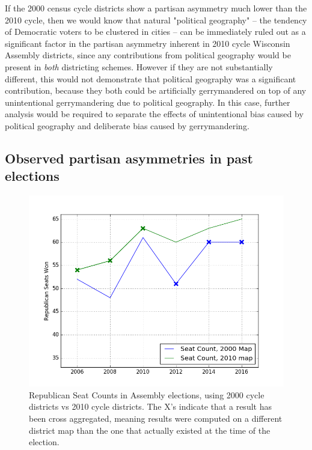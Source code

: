 \documentclass[preprint,12pt]{article}
\begin{document}
If the 2000 census cycle districts show a partisan asymmetry much lower than the 2010 cycle, then we would know that natural "political geography" -- the tendency of Democratic voters to be clustered in cities -- can be immediately ruled out as a significant factor in the partisan asymmetry inherent in 2010 cycle Wisconsin Assembly districts, since any contributions from political geography would be present in \emph{both} districting schemes.
However if they are not substantially different, this would not demonstrate that political geography was a significant contribution, because they both could be artificially gerrymandered on top of any unintentional gerrymandering due to political geography.
In this case, further analysis would be required to separate the effects of unintentional bias caused by political geography and deliberate bias caused by gerrymandering.

\subsection{Observed partisan asymmetries in past elections}

\begin{figure}[htb!]
    \begin{center}
        \includegraphics[scale=0.85]{../Figures/WI2010/WI_2000_2010_seats.png}
        \caption{Republican Seat Counts in Assembly elections, using 2000 cycle districts vs 2010 cycle districts. The X's indicate that a result has been cross aggregated, meaning results were computed on a different district map than the one that actually existed at the time of the election.}\label{fig:Seats20002010}
    \end{center}
\end{figure}
\end{document}
